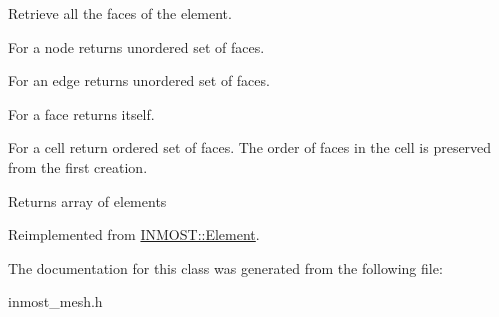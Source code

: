 Retrieve all the faces of the element. 

For a node returns unordered set of faces.

For an edge returns unordered set of faces.

For a face returns itself.

For a cell return ordered set of faces. The order of faces in the cell is preserved from the first creation.

\begin{DoxyReturn}{Returns}
array of elements 
\end{DoxyReturn}


Reimplemented from \hyperlink{classINMOST_1_1Element_a2d9cc22d44f8d70c5b2876d84be6dfa5}{I\-N\-M\-O\-S\-T\-::\-Element}.



The documentation for this class was generated from the following file\-:\begin{DoxyCompactItemize}
\item 
inmost\-\_\-mesh.\-h\end{DoxyCompactItemize}
